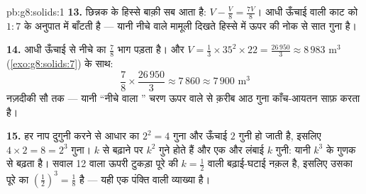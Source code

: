 \begin{solution}{pb:g8:solids:1}
\textbf{13.} छिन्नक के हिस्से बाक़ी सब आता है:
$V - \frac V8 = \frac{7V}{8}$। आधी ऊँचाई वाली काट  को
$1 : 7$ के अनुपात में बाँटती है --- यानी नीचे वाले मामूली दिखते
हिस्से में ऊपर की नोक से सात गुना  है।

\textbf{14.} आधी ऊँचाई से नीचे  का $\frac78$ भाग पड़ता है। और
$V = \frac13 \times 35^2 \times 22 = \frac{26\,950}{3} \approx
8\,983$ m$^3$ (\cref{exo:g8:solids:7}) के साथ:
\[
\frac78 \times \frac{26\,950}{3} \approx 7\,860 \approx
7\,900 \text{ m}^3
\]
नज़दीकी सौ तक --- यानी ``नीचे वाला '' चरण ऊपर वाले से क़रीब आठ
गुना काँच-आयतन साफ़ करता है।

\textbf{15.} हर नाप दुगुनी करने से आधार का  $2^2 = 4$ गुना
और ऊँचाई $2$ गुनी हो जाती है, इसलिए 
$4 \times 2 = 8 = 2^3$ गुना। $k$ से बढ़ाने पर  $k^2$ गुने
होते हैं और एक और लंबाई $k$ गुनी: यानी  $k^3$ के गुणक से बढ़ता
है। सवाल 12 वाला ऊपरी टुकड़ा पूरे  की $k = \frac12$ वाली
बढ़ाई-घटाई नक़ल है, इसलिए उसका  पूरे का
$\left(\frac12\right)^3 = \frac18$ है --- यही एक पंक्ति वाली
व्याख्या है।

\end{solution}
